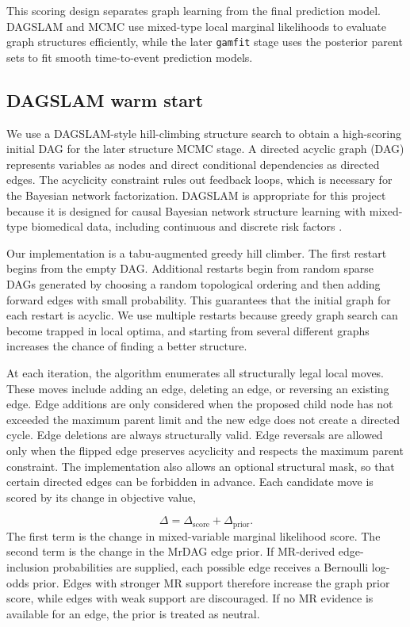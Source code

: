 \documentclass[11pt]{article}
\begin{document}
This scoring design separates graph learning from the final prediction model. DAGSLAM and MCMC use mixed-type local marginal likelihoods to evaluate graph structures efficiently, while the later \texttt{gamfit} stage uses the posterior parent sets to fit smooth time-to-event prediction models.


\subsection{DAGSLAM warm start}

We use a DAGSLAM-style hill-climbing structure search to obtain a high-scoring initial DAG for the later structure MCMC stage. A directed acyclic graph (DAG) represents variables as nodes and direct conditional dependencies as directed edges. The acyclicity constraint rules out feedback loops, which is necessary for the Bayesian network factorization. DAGSLAM is appropriate for this project because it is designed for causal Bayesian network structure learning with mixed-type biomedical data, including continuous and discrete risk factors \citep{Zhao2025DAGSLAM}.

Our implementation is a tabu-augmented greedy hill climber. The first restart begins from the empty DAG. Additional restarts begin from random sparse DAGs generated by choosing a random topological ordering and then adding forward edges with small probability. This guarantees that the initial graph for each restart is acyclic. We use multiple restarts because greedy graph search can become trapped in local optima, and starting from several different graphs increases the chance of finding a better structure.

At each iteration, the algorithm enumerates all structurally legal local moves. These moves include adding an edge, deleting an edge, or reversing an existing edge. Edge additions are only considered when the proposed child node has not exceeded the maximum parent limit and the new edge does not create a directed cycle. Edge deletions are always structurally valid. Edge reversals are allowed only when the flipped edge preserves acyclicity and respects the maximum parent constraint. The implementation also allows an optional structural mask, so that certain directed edges can be forbidden in advance.
Each candidate move is scored by its change in objective value,

\[
\Delta = \Delta_{\text{score}} + \Delta_{\text{prior}}.
\]
The first term is the change in mixed-variable marginal likelihood score. The second term is the change in the MrDAG edge prior. If MR-derived edge-inclusion probabilities are supplied, each possible edge receives a Bernoulli log-odds prior. Edges with stronger MR support therefore increase the graph prior score, while edges with weak support are discouraged. If no MR evidence is available for an edge, the prior is treated as neutral.
\end{document}
